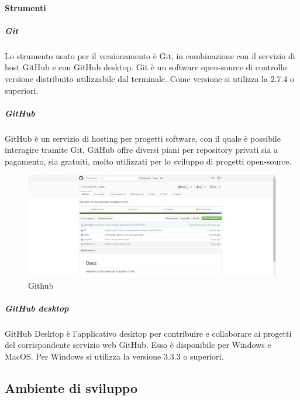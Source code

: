 \paragraph{Strumenti}
 \subparagraph{Git}
 Lo strumento usato per il versionamento è Git, in combinazione con il servizio di host GitHub e con GitHub desktop.
 Git è un software open-source di controllo versione distribuito utilizzabile dal terminale. Come versione si utilizza la 2.7.4 o superiori.
 \subparagraph{GitHub}
 GitHub è un servizio di hosting per progetti software, con il quale è possibile interagire tramite Git. GitHub
 offre diversi piani per repository privati sia a pagamento, sia gratuiti, molto utilizzati per lo
 sviluppo di progetti open-source.
 \begin{figure}[h]
 	\centering
 	\includegraphics[scale=0.4]{img/github.png}
 	\caption{Github}\label{sec:Figura4}
 \end{figure}
 \subparagraph{GitHub desktop}
 GitHub Desktop è l'applicativo desktop per contribuire e collaborare ai progetti del corrispondente servizio web GitHub. Esso è disponibile per Windows e MacOS. Per Windows si utilizza la versione 3.3.3 o superiori.
\newpage
\subsection{Ambiente di sviluppo}\label{Sviluppo}
